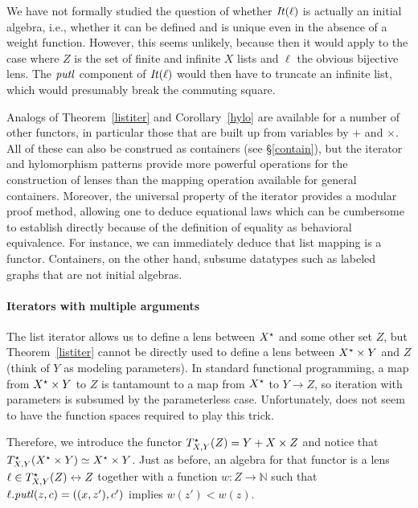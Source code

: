 \begin{defn}[$R$-similarity]
\begin{theorem}
\begin{lemma}
\begin{theorem}[No products]
\begin{lemma}
\begin{defn}
\begin{theorem}
\begin{theorem}
\begin{corollary}[Hylomorphism]
We have not formally studied the question of whether $\mathit{It}(\ell)$
is actually an initial algebra, i.e., whether it can
be defined and is unique even in the absence of a weight function. However,
this seems unlikely, because then it would apply to the case where $Z$ is the
set of finite and infinite $X$ lists and $\ell$ the obvious bijective lens.
The $\mathit{putl}$ component of $\mathit{It}(\ell)$ would then have to truncate an infinite
list, which would presumably break the commuting square.

Analogs of Theorem~\ref{listiter} and
Corollary~\ref{hylo} are available for a number of other functors, in
particular those that are built up from variables by $+$ and $\times$.
All of these can also be construed as containers (see
\S\ref{contain}), but the iterator and hylomorphism patterns
provide more powerful operations for the construction of lenses than
the mapping operation available for general containers. Moreover, the
universal property of the iterator provides a modular proof method,
allowing one to deduce equational laws which can be cumbersome to
establish directly because of the definition of equality as behavioral
equivalence. For instance, we can immediately deduce that list mapping
is a functor. Containers, on the other hand, subsume datatypes such as labeled graphs that are not initial algebras. 

\paragraph{Iterators with multiple arguments}
The list iterator allows us to define a lens between $X^\star$ and some
other set $Z$, but Theorem~\ref{listiter} cannot be directly used to define
a lens between $X^\star \times Y$ and $Z$ (think of $Y$ as modeling
parameters).  In standard functional programming, a
map from $X^\star\times Y$ to $Z$ is tantamount to a map from $X^\star$
to $Y{\rightarrow}Z$, so iteration with parameters is subsumed by
the parameterless case. Unfortunately, \LENS{} does not seem to have the
function spaces required to play this trick.

Therefore, we introduce the functor $T^\star_{X,Y}(Z)=Y + X \times
Z$ and notice that $T^\star_{X,Y}(X^\star \times Y)\simeq X^\star \times
Y$. Just as before, 
an algebra for that functor is a lens $\ell \in T^\star_{X,Y}(Z)\leftrightarrow Z$ together with a function $w:Z\rightarrow \mathbb{N}$ such that 
$\ell.\mathit{putl}(z,c) = ((x,z'),c')$ implies $w(z')<w(z)$.


\end{corollary}
\end{theorem}
\end{theorem}
\end{defn}
\end{lemma}
\end{theorem}
\end{lemma}
\end{theorem}
\end{defn}
